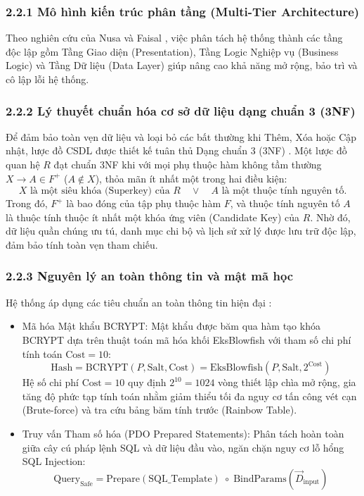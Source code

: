 \documentclass[12pt,a4paper]{report}
\begin{document}
\subsubsection*{2.2.1 Mô hình kiến trúc phân tầng (Multi-Tier Architecture)}
Theo nghiên cứu của Nusa và Faisal \cite{nusa2020iop}, việc phân tách hệ thống thành các tầng độc lập gồm Tầng Giao diện (Presentation), Tầng Logic Nghiệp vụ (Business Logic) và Tầng Dữ liệu (Data Layer) giúp nâng cao khả năng mở rộng, bảo trì và cô lập lỗi hệ thống.

\subsubsection*{2.2.2 Lý thuyết chuẩn hóa cơ sở dữ liệu dạng chuẩn 3 (3NF)}
Để đảm bảo toàn vẹn dữ liệu và loại bỏ các bất thường khi Thêm, Xóa hoặc Cập nhật, lược đồ CSDL được thiết kế tuân thủ Dạng chuẩn 3 (3NF) \cite{kartinah2022eajmr}. Một lược đồ quan hệ $R$ đạt chuẩn 3NF khi với mọi phụ thuộc hàm không tầm thường $X \to A \in F^+$ ($A \notin X$), thỏa mãn ít nhất một trong hai điều kiện:
\begin{equation}
  X \text{ là một siêu khóa (Superkey) của } R \quad \lor \quad A \text{ là một thuộc tính nguyên tố}.
\end{equation}
Trong đó, $F^+$ là bao đóng của tập phụ thuộc hàm $F$, và thuộc tính nguyên tố $A$ là thuộc tính thuộc ít nhất một khóa ứng viên (Candidate Key) của $R$. Nhờ đó, dữ liệu quần chúng ưu tú, danh mục chi bộ và lịch sử xử lý được lưu trữ độc lập, đảm bảo tính toàn vẹn tham chiếu.

\subsubsection*{2.2.3 Nguyên lý an toàn thông tin và mật mã học}
Hệ thống áp dụng các tiêu chuẩn an toàn thông tin hiện đại \cite{sinlae2024jsmd}:
\begin{itemize}[label=--,leftmargin=*]
  \item Mã hóa Mật khẩu BCRYPT: Mật khẩu được băm qua hàm tạo khóa BCRYPT dựa trên thuật toán mã hóa khối EksBlowfish với tham số chi phí tính toán $\text{Cost} = 10$:
        \begin{equation}
          \text{Hash} = \text{BCRYPT}(P, \text{Salt}, \text{Cost}) = \text{EksBlowfish}\left(P, \text{Salt}, 2^{\text{Cost}}\right)
        \end{equation}
        Hệ số chi phí $\text{Cost} = 10$ quy định $2^{10} = 1024$ vòng thiết lập chìa mở rộng, gia tăng độ phức tạp tính toán nhằm giảm thiểu tối đa nguy cơ tấn công vét cạn (Brute-force) và tra cứu bảng băm tính trước (Rainbow Table).
  \item Truy vấn Tham số hóa (PDO Prepared Statements): Phân tách hoàn toàn giữa cây cú pháp lệnh SQL và dữ liệu đầu vào, ngăn chặn nguy cơ lỗ hổng SQL Injection:
        \begin{equation}
          \text{Query}_{\text{Safe}} = \text{Prepare}(\text{SQL\_Template}) \;\circ\; \text{BindParams}(\vec{D}_{\text{input}})
        \end{equation}
\end{itemize}
\end{document}
